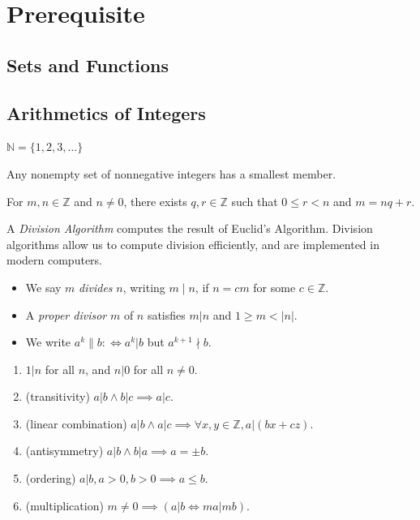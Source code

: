 
\section{Prerequisite}
\subsection{Sets and Functions}

\subsection{Arithmetics of Integers}

\begin{notation}
	$\mathbb{N} = \{1,2,3,\ldots\} $
\end{notation}

\begin{theorem}
	Any nonempty set of nonnegative integers has a smallest member.
\end{theorem}

\begin{theorem}
	For $m,n \in  \mathbb{Z}$ and $n \neq  0$, there exists $q, r \in  \mathbb{Z}$ such that $0 \le  r < n$ and $m = n q + r $.
\end{theorem}

A \textit{Division Algorithm} computes the result of Euclid's Algorithm. Division algorithms allow us to compute division efficiently, and are implemented in modern computers.

\begin{definition}[Divisibility]
	\quad
	\begin{itemize}
		\item We say $m $ \textit{divides} $n$, writing $m \mid n$, if $n = cm$ for some $c \in  \mathbb{Z}$.
		\item A \textit{proper divisor} $m$ of $n$ satisfies $m | n$ and $1 \ge m < |n|$.
		\item We write $a^k \|  b :\iff a^k | b $ but $a^{k+1}\nmid b $.
	\end{itemize}\end{definition}

\begin{lemma}
	\quad
	\begin{enumerate}
		\item $1 | n$ for all $n$, and $n | 0$ for all $n \neq  0$.
		\item (transitivity) $a | b \land  b | c \implies a | c $.
		\item (linear combination) $a | b \land  a | c \implies \forall x,y \in \mathbb{Z}, a|\left( bx+cz  \right) $.
		\item (antisymmetry) $a|b \land b|a \implies a = \pm b $.
		\item (ordering) $a|b, a>0, b>0 \implies a\le b $.
		\item (multiplication) $m \neq  0 \implies \left( a | b \iff ma | mb \right) $.
	\end{enumerate}
\end{lemma}

